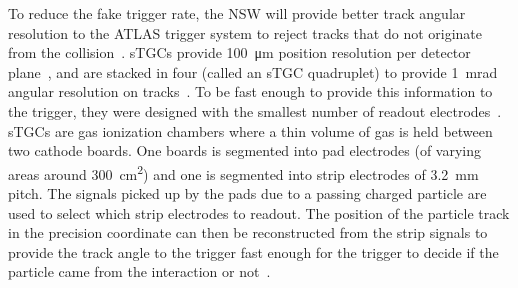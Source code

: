To reduce the fake trigger rate, the NSW will provide better track angular resolution to the ATLAS trigger system to reject tracks that do not originate from the collision~\cite{nsw_tdr}. sTGCs provide \SI{100}{\micro\meter} position resolution per detector plane~\cite{abusleme_performance_2016}, and are stacked in four (called an sTGC quadruplet) to provide \SI{1}{mrad} angular resolution on tracks~\cite{nsw_tdr, perez-codina_small-strip_2016}. To be fast enough to provide this information to the trigger, they were designed with the smallest number of readout electrodes~\cite{nsw_tdr}. sTGCs are gas ionization chambers where a thin volume of gas is held between two cathode boards. One boards is segmented into pad electrodes (of varying areas around \SI{300}{\centi\meter\squared}) and one is segmented into strip electrodes of \SI{3.2}{mm} pitch. The signals picked up by the pads due to a passing charged particle are used to select which strip electrodes to readout. The position of the particle track in the precision coordinate can then be reconstructed from the strip signals to provide the track angle to the trigger fast enough for the trigger to decide if the particle came from the interaction or not~\cite{nsw_tdr}.


